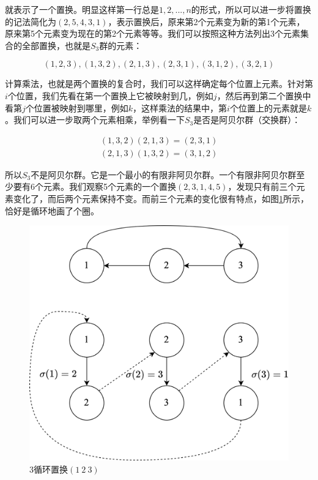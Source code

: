 \documentclass[b5paper]{ctexart}
\begin{document}
就表示了一个置换。明显这样第一行总是$1, 2, ..., n$的形式，所以可以进一步将置换的记法简化为$(2, 5, 4, 3, 1)$，表示置换后，原来第2个元素变为新的第1个元素，原来第5个元素变为现在的第2个元素等等。我们可以按照这种方法列出3个元素集合的全部置换，也就是$S_3$群的元素：

\[
(1, 2, 3), (1, 3, 2), (2, 1, 3), (2, 3, 1), (3, 1, 2), (3, 2, 1)
\]

计算乘法，也就是两个置换的复合时，我们可以这样确定每个位置上元素。针对第$i$个位置，我们先看在第一个置换上它被映射到几，例如$j$，然后再到第二个置换中看第$j$个位置被映射到哪里，例如$k$，这样乘法的结果中，第$i$个位置上的元素就是$k$。我们可以进一步取两个元素相乘，举例看一下$S_3$是否是阿贝尔群（交换群）：

\[
\begin{array}{l}
(1, 3, 2) (2, 1, 3) = (2, 3, 1) \\
(2, 1, 3) (1, 3, 2) = (3, 1, 2)
\end{array}
\]

所以$S_3$不是阿贝尔群。它是一个最小的有限非阿贝尔群。一个有限非阿贝尔群至少要有6个元素。我们观察5个元素的一个置换$(2, 3, 1, 4, 5)$，发现只有前三个元素变化了，而后两个元素保持不变。而前三个元素的变化很有特点，如图\ref{fig:cycle-permutation}所示，恰好是循环地画了个圈。

\begin{figure}[htbp]
\centering
\includegraphics[scale=0.6]{img/3-cycle}
\caption{3循环置换$(1\ 2\ 3)$}
\label{fig:cycle-permutation}
\end{figure}
\end{document}
